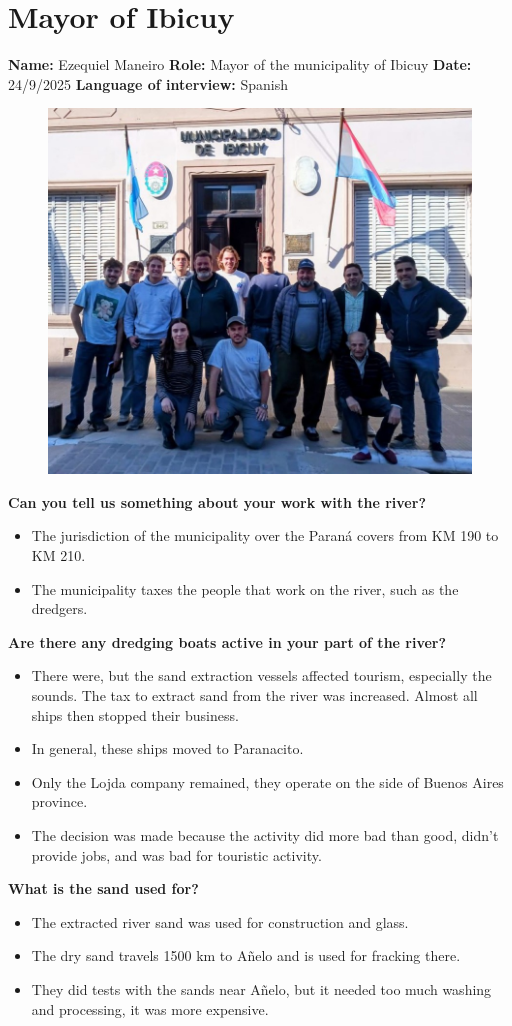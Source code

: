\section{Mayor of Ibicuy}
\textbf{Name:} Ezequiel Maneiro \newline
\textbf{Role:} Mayor of the municipality of Ibicuy \newline
\textbf{Date:} 24/9/2025 \newline
\textbf{Language of interview:} Spanish
\begin{figure}[H]
    \centering
    \includegraphics[width=0.4\linewidth]{figures/appendixE/InterviewMayor.jpeg}
\end{figure}

\textbf{Can you tell us something about your work with the river?}
\begin{itemize}
    \item The jurisdiction of the municipality over the Paraná covers from KM 190 to KM 210.
    \item The municipality taxes the people that work on the river, such as the dredgers.    
\end{itemize}

\textbf{Are there any dredging boats active in your part of the river?}
\begin{itemize}
    \item There were, but the sand extraction vessels affected tourism, especially the sounds. The tax to extract sand from the river was increased. Almost all ships then stopped their business.
    \item In general, these ships moved to Paranacito.
    \item Only the Lojda company remained, they operate on the side of Buenos Aires province.
    \item The decision was made because the activity did more bad than good, didn’t provide jobs, and was bad for touristic activity.
\end{itemize}

\textbf{What is the sand used for?}
\begin{itemize}
    \item The extracted river sand was used for construction and glass.
    \item The dry sand travels 1500 km to Añelo and is used for fracking there.
    \item They did tests with the sands near Añelo, but it needed too much washing and processing, it was more expensive. 
\end{itemize}

